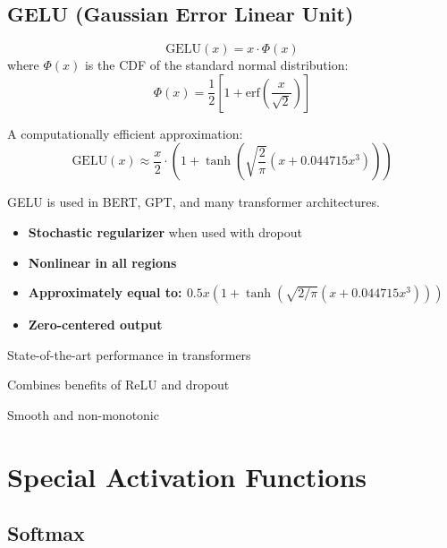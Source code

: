 \subsection{GELU (Gaussian Error Linear Unit)}

\begin{equation}
\text{GELU}(x) = x \cdot \Phi(x)
\end{equation}
where $\Phi(x)$ is the CDF of the standard normal distribution:
\begin{equation}
\Phi(x) = \frac{1}{2}\left[1 + \text{erf}\left(\frac{x}{\sqrt{2}}\right)\right]
\end{equation}

A computationally efficient approximation:
\begin{equation}
\text{GELU}(x) \approx \frac{x}{2} \cdot \left(1 + \tanh\left(\sqrt{\frac{2}{\pi}}\left(x + 0.044715x^3\right)\right)\right)
\end{equation}

GELU is used in BERT, GPT, and many transformer architectures.

\begin{properties}
\begin{itemize}
    \item \textbf{Stochastic regularizer} when used with dropout
    \item \textbf{Nonlinear in all regions}
    \item \textbf{Approximately equal to: $0.5x(1 + \tanh(\sqrt{2/\pi}(x + 0.044715x^3)))$}
    \item \textbf{Zero-centered output}
\end{itemize}
\end{properties}

\begin{advantages}
    \item State-of-the-art performance in transformers
    \item Combines benefits of ReLU and dropout
    \item Smooth and non-monotonic
\end{advantages}

\section{Special Activation Functions}

\subsection{Softmax}


